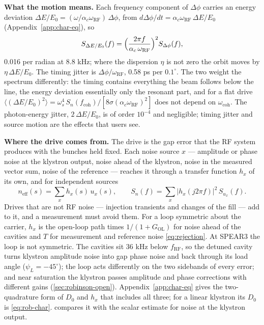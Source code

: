 \textbf{What the motion means.} Each frequency component of \(\Delta\phi\) carries an energy deviation \(\Delta E/E_0 = (\omega/\alpha_c\omega_\text{RF})\,\Delta\phi\), from \(d\Delta\phi/dt = \alpha_c\omega_\text{RF}\,\Delta E/E_0\) (Appendix~\ref{app:char-eq}), so
\begin{equation}\label{eq:rob-energy}
S_{\Delta E/E_0}(f) = \Bigl(\frac{2\pi f}{\alpha_c\,\omega_\text{RF}}\Bigr)^2 S_{\Delta\phi}(f),
\end{equation}
0.016 per radian at 8.8 kHz; where the dispersion \(\eta\) is not zero the orbit moves by \(\eta\,\Delta E/E_0\). The timing jitter is \(\Delta\phi/\omega_\text{RF}\), 0.58 ps per \(0.1^\circ\). The two weight the spectrum differently: the timing contains everything the beam follows below the line, the energy deviation essentially only the resonant part, and for a flat drive \(\langle(\Delta E/E_0)^2\rangle = \omega_s^4\,S_n(f_\text{coh})/[8\sigma(\alpha_c\omega_\text{RF})^2]\) does not depend on \(\omega_\text{coh}\). The photon-energy jitter, \(2\,\Delta E/E_0\), is of order \(10^{-4}\) and negligible; timing jitter and source motion are the effects that users see.

\textbf{Where the drive comes from.} The drive is the gap error that the RF system produces with the bunches held fixed. Each noise source \(x\) --- amplitude or phase noise at the klystron output, noise ahead of the klystron, noise in the measured vector sum, noise of the reference --- reaches it through a transfer function \(h_x\) of its own, and for independent sources
\begin{equation}\label{eq:rob-drive}
n_\text{eff}(s) = \sum_x h_x(s)\,u_x(s),
\qquad
S_n(f) = \sum_x \lvert h_x(j2\pi f)\rvert^2\,S_{u_x}(f).
\end{equation}
Drives that are not RF noise --- injection transients and changes of the fill --- add to it, and a measurement must avoid them. For a loop symmetric about the carrier, \(h_x\) is the open-loop path times \(1/(1 + G_\text{OL})\) for noise ahead of the cavities and \(T\) for measurement and reference noise \eqref{eq:rejection}. At SPEAR3 the loop is not symmetric. The cavities sit 36 kHz below \(f_\text{RF}\), so the detuned cavity turns klystron amplitude noise into gap phase noise and back through its load angle (\(\psi_L = -45^\circ\)); the loop acts differently on the two sidebands of every error; and near saturation the klystron passes amplitude and phase corrections with different gains (\cref{sec:robinson-open}). Appendix~\ref{app:char-eq} gives the two-quadrature form of \(D_0\) and \(h_x\) that includes all three; for a linear klystron its \(D_0\) is \cref{eq:rob-char}.  compares it with the scalar estimate for noise at the klystron output.

